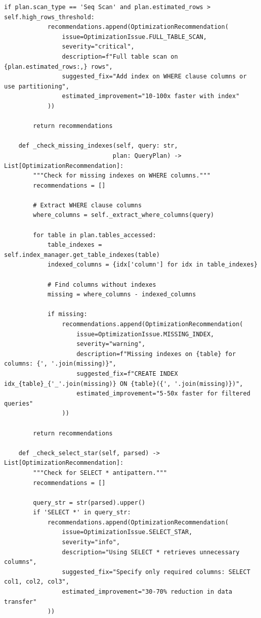 \begin{lstlisting}[style=python, caption=QueryOptimizer with Cost-Based Analysis]
        if plan.scan_type == 'Seq Scan' and plan.estimated_rows > self.high_rows_threshold:
            recommendations.append(OptimizationRecommendation(
                issue=OptimizationIssue.FULL_TABLE_SCAN,
                severity="critical",
                description=f"Full table scan on {plan.estimated_rows:,} rows",
                suggested_fix="Add index on WHERE clause columns or use partitioning",
                estimated_improvement="10-100x faster with index"
            ))

        return recommendations

    def _check_missing_indexes(self, query: str,
                              plan: QueryPlan) -> List[OptimizationRecommendation]:
        """Check for missing indexes on WHERE columns."""
        recommendations = []

        # Extract WHERE clause columns
        where_columns = self._extract_where_columns(query)

        for table in plan.tables_accessed:
            table_indexes = self.index_manager.get_table_indexes(table)
            indexed_columns = {idx['column'] for idx in table_indexes}

            # Find columns without indexes
            missing = where_columns - indexed_columns

            if missing:
                recommendations.append(OptimizationRecommendation(
                    issue=OptimizationIssue.MISSING_INDEX,
                    severity="warning",
                    description=f"Missing indexes on {table} for columns: {', '.join(missing)}",
                    suggested_fix=f"CREATE INDEX idx_{table}_{'_'.join(missing)} ON {table}({', '.join(missing)})",
                    estimated_improvement="5-50x faster for filtered queries"
                ))

        return recommendations

    def _check_select_star(self, parsed) -> List[OptimizationRecommendation]:
        """Check for SELECT * antipattern."""
        recommendations = []

        query_str = str(parsed).upper()
        if 'SELECT *' in query_str:
            recommendations.append(OptimizationRecommendation(
                issue=OptimizationIssue.SELECT_STAR,
                severity="info",
                description="Using SELECT * retrieves unnecessary columns",
                suggested_fix="Specify only required columns: SELECT col1, col2, col3",
                estimated_improvement="30-70% reduction in data transfer"
            ))


\end{lstlisting}
